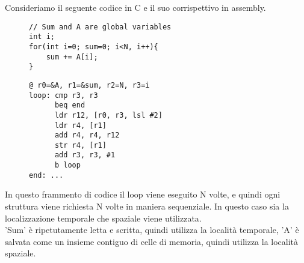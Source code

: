 \noindent Consideriamo il seguente codice in C e il suo corrispettivo in assembly.
\begin{figure}[!h]
\begin{minipage}[t]{0.45\linewidth}
\centering
\begin{lstlisting}
// Sum and A are global variables
int i;
for(int i=0; sum=0; i<N, i++){
    sum += A[i];
}
\end{lstlisting}
\end{minipage}
\hspace{.35cm}
\begin{minipage}[t]{0.45\linewidth}
\begin{lstlisting}[language={[x86masm]Assembler}]
@ r0=&A, r1=&sum, r2=N, r3=i
loop: cmp r3, r3
      beq end
      ldr r12, [r0, r3, lsl #2]
      ldr r4, [r1]
      add r4, r4, r12
      str r4, [r1]
      add r3, r3, #1
      b loop
end: ...
\end{lstlisting}
\end{minipage}
\end{figure}

In questo frammento di codice il loop viene eseguito N volte, e quindi ogni struttura viene richiesta N volte in maniera sequenziale. In questo caso sia la localizzazione temporale che spaziale viene utilizzata.\\
'Sum' è ripetutamente letta e scritta, quindi utilizza la località temporale, 'A' è salvata come un insieme contiguo di celle di memoria, quindi utilizza la località spaziale.